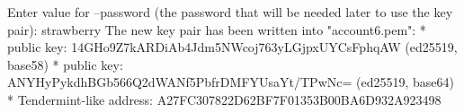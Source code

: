 \begin{shellbox}\begin{ttlst}
Enter value for --password (the password that will be needed later to use the key pair): strawberry
The new key pair has been written into "account6.pem":
* public key: 14GHo9Z7kARDiAb4Jdm5NWcoj763yLGjpxUYCsFphqAW (ed25519, base58)
* public key: ANYHyPykdhBGb566Q2dWANf5PbfrDMFYUsaYt/TPwNc= (ed25519, base64)
* Tendermint-like address: A27FC307822D62BF7F01353B00BA6D932A923498
\end{ttlst}\end{shellbox}
